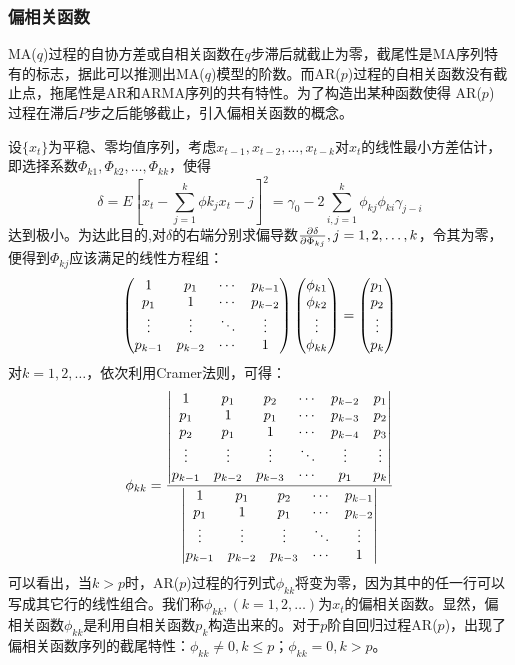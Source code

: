 \subsubsection{偏相关函数}
MA($q$)过程的自协方差或自相关函数在$q$步滞后就截止为零，截尾性是MA序列特有的标志，据此可以推测出MA($q$)模型的阶数。而AR($p$)过程的自相关函数没有截止点，拖尾性是AR和ARMA序列的共有特性。为了构造出某种函数使得 AR($p$) 过程在滞后$P$步之后能够截止，引入偏相关函数的概念。

设$\{x_t\}$为平稳、零均值序列，考虑$x_{t-1},x_{t-2},\dots,x_{t-k}$对$x_t$的线性最小方差估计，即选择系数$\Phi_{k1},\Phi_{k2},\dots,\Phi_{kk}$，使得$$\delta = E[x_t - \sum_{j=1}^{k}\phi k_j x_t -j]^2 = \gamma_0-2 \sum_{i,j=1}^{k} \phi_{kj} \phi_{ki} \gamma_{j-i} $$ 达到极小。为达此目的,对$\delta$的右端分别求偏导数${\partial \delta \over \partial \Phi_{kj}} , j=1,2,\dots,k$，令其为零，便得到$\Phi_{kj}$应该满足的线性方程组：
\begin{equation}
	\left( 
			 \begin{matrix}
				 1 & p_1 & \cdots & p_{k-1} \cr
				 p_1 & 1 & \cdots & p_{k-2} \cr
				 \vdots  & \vdots  & \ddots & \vdots  \cr
				 p_{k-1} & p_{k-2} & \cdots & 1 \cr
			\end{matrix}
			\right) 
	\left(  \begin{matrix}
	\phi_{k1} \cr
	\phi_{k2} \cr
	\vdots \cr
	\phi_{kk} \cr
	\end{matrix} \right) 
					=
	\left( \begin{matrix}
	p_1 \cr
	p_2 \cr
	\vdots \cr
	p_k \cr
	\end{matrix}  \right) 
\end{equation}
对$k=1,2,\dots$，依次利用Cramer法则，可得：
\begin{equation}
	\phi_{kk} = {
		\left|  \begin{matrix}
				1 & p_1 & p_2 & \cdots & p_{k-2} & p_1 \cr
				p_1 & 1 & p_1 & \cdots & p_{k-3} & p_2 \cr
				p_2 & p_1 & 1 & \cdots & p_{k-4} & p_3 \cr
				\vdots & \vdots & \vdots & \ddots & \vdots & \vdots \cr
				p_{k-1} & p_{k-2} & p_{k-3} & \cdots & p_1 & p_k \cr
		\end{matrix} \right| 
		\over 
		\left|  \begin{matrix}
				1 & p_1 & p_2 & \cdots & p_{k-1} \cr
				p_1 & 1 & p_1 & \cdots & p_{k-2} \cr
				\vdots & \vdots & \vdots & \ddots & \vdots \cr
				p_{k-1} & p_{k-2} & p_{k-3} & \cdots & 1 \cr
		\end{matrix} \right| 
		}
\end{equation}
可以看出，当$k>p$时，AR($p$)过程的行列式$\phi_{kk}$将变为零，因为其中的任一行可以写成其它行的线性组合。我们称$\phi_{kk},(k=1,2,\dots)$为$x_t$的偏相关函数。显然，偏相关函数$\phi_{kk}$是利用自相关函数$p_k$构造出来的。对于$p$阶自回归过程AR($p$)，出现了偏相关函数序列的截尾特性：$\phi_{kk} \neq 0 , k \leqslant p$；$\phi_{kk} =0 , k > p$。

